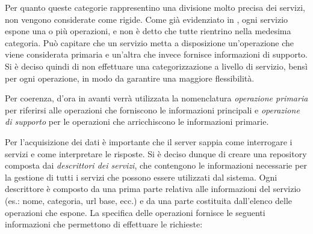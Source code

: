 Per quanto queste categorie rappresentino una divisione molto precisa dei servizi, non vengono considerate come rigide. Come già evidenziato in \cite{rizzo2015progettazione}, ogni servizio espone una o più operazioni, e non è detto che tutte rientrino nella medesima categoria. Può capitare che un servizio metta a disposizione un'operazione che viene considerata primaria e un'altra che invece fornisce informazioni di supporto. Si è deciso quindi di non effettuare una categorizzazione a livello di servizio, bensì per ogni operazione, in modo da garantire una maggiore flessibilità.

Per coerenza, d'ora in avanti verrà utilizzata la nomenclatura \emph{operazione primaria} per riferirsi alle operazioni che forniscono le informazioni principali e \emph{operazione di supporto} per le operazioni che arricchiscono le informazioni primarie.

Per l'acquisizione dei dati è importante che il server sappia come interrogare i servizi e come interpretare le risposte. Si è deciso dunque di creare una repository composta dai \emph{descrittori dei servizi}, che contengono le informazioni necessarie per la gestione di tutti i servizi che possono essere utilizzati dal sistema. Ogni descrittore è composto da una prima parte relativa alle informazioni del servizio (es.: nome, categoria, url base, ecc.) e da una parte costituita dall'elenco delle operazioni che espone. La specifica delle operazioni fornisce le seguenti informazioni che permettono di effettuare le richieste:

